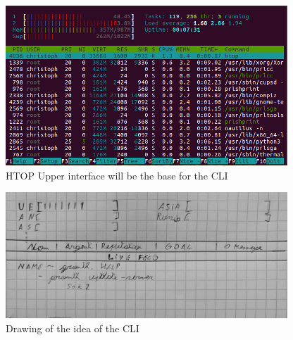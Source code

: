 \begin{figure}
\begin{center}
\includegraphics{images/htop.png}
\end{center}
\caption{ HTOP Upper interface will be the base for the CLI }
\label{HTOP}
\end{figure}

\begin{figure}
\begin{center}
\includegraphics{images/CLITest.png}
\end{center}
\caption{ Drawing of the idea of the CLI }
\label{CLITest}
\end{figure}


